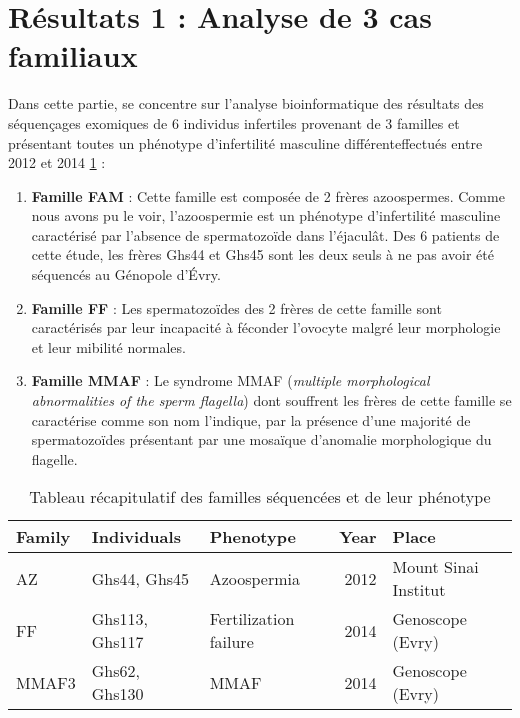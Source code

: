 \documentclass[12pt,twoside]{reedthesis}
\providecommand{\tightlist}{%
  \setlength{\itemsep}{0pt}\setlength{\parskip}{0pt}}
\theoremstyle{definition}
\theoremstyle{definition}
\theoremstyle{remark}
\begin{document}
  \section{Résultats 1 : Analyse de 3 cas
  familiaux}\label{resultats-1-analyse-de-3-cas-familiaux}
  
  Dans cette partie, se concentre sur l'analyse bioinformatique des
  résultats des séquençages exomiques de 6 individus infertiles provenant
  de 3 familles et présentant toutes un phénotype d'infertilité masculine
  différenteffectués entre 2012 et 2014 \ref{tab:tabfam} :
  
  \begin{enumerate}
  \def\labelenumi{\arabic{enumi}.}
  \tightlist
  \item
    \textbf{Famille FAM} : Cette famille est composée de 2 frères
    azoospermes. Comme nous avons pu le voir, l'azoospermie est un
    phénotype d'infertilité masculine caractérisé par l'absence de
    spermatozoïde dans l'éjaculât. Des 6 patients de cette étude, les
    frères Ghs44 et Ghs45 sont les deux seuls à ne pas avoir été séquencés
    au Génopole d'Évry.\\
  \item
    \textbf{Famille FF} : Les spermatozoïdes des 2 frères de cette famille
    sont caractérisés par leur incapacité à féconder l'ovocyte malgré leur
    morphologie et leur mibilité normales.\\
  \item
    \textbf{Famille MMAF} : Le syndrome MMAF (\emph{multiple morphological
    abnormalities of the sperm flagella}) dont souffrent les frères de
    cette famille se caractérise comme son nom l'indique, par la présence
    d'une majorité de spermatozoïdes présentant par une mosaïque
    d'anomalie morphologique du flagelle.
  \end{enumerate}
  
  \begin{longtable}[t]{lllrl}
  \caption{\label{tab:tabfam}Tableau récapitulatif des familles séquencées et de leur phénotype}\\
  \toprule
  Family & Individuals & Phenotype & Year & Place\\
  \midrule
  AZ & Ghs44, Ghs45 & Azoospermia & 2012 & Mount Sinai Institut\\
  FF & Ghs113, Ghs117 & Fertilization failure & 2014 & Genoscope (Evry)\\
  MMAF3 & Ghs62, Ghs130 & MMAF & 2014 & Genoscope (Evry)\\
  \bottomrule
  \end{longtable}
  
\end{document}
